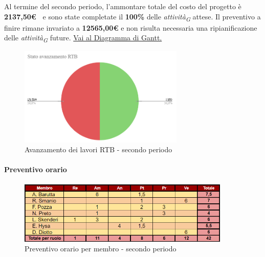 \vspace{1cm}

Al termine del secondo periodo, l'ammontare totale del costo del progetto è \textbf{2137,50\euro\ } e sono state completate il \textbf{100\%} delle \textit{attività}\textsubscript{\textit{G}} attese.
Il preventivo a finire rimane invariato a \textbf{12565,00€} e non risulta necessaria una ripianificazione delle \textit{attività}\textsubscript{\textit{G}} future.
\href{https://github.com/orgs/ByteOps-swe/projects/3/views/1?sortedBy%5Bdirection%5D=asc&sortedBy%5BcolumnId%5D=64182560}{Vai al Diagramma di Gantt.}


\begin{figure}[H]
    \centering
    \begin{minipage}[b]{0.70\textwidth}
        \centering
        \includegraphics[width=0.7\textwidth]{../Images/avanzamento2Periodo.png}
        \caption{Avanzamento dei lavori RTB - secondo periodo}
        \label{fig:Avanzamento_RTB_2}
    \end{minipage}
\end{figure}



\paragraph{Preventivo orario}

\begin{figure}[H]
    \centering
    \includegraphics[width=0.9\textwidth]{../Images/preventivoOrario2Periodo.png}
    \caption{Preventivo orario per membro - secondo periodo}
    \label{fig:Preventivo_orario_2}
\end{figure}

